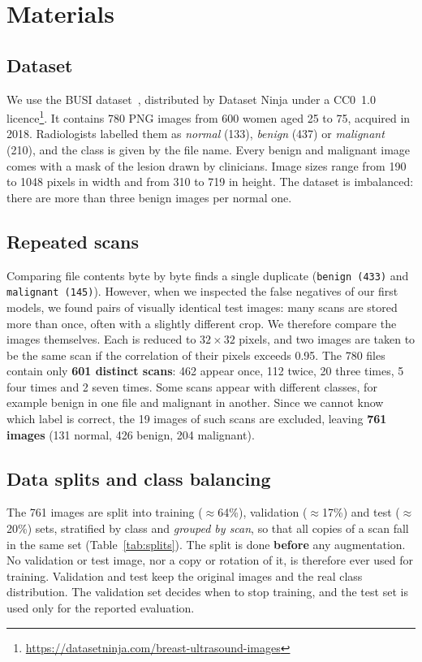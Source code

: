 \documentclass{article}
\begin{document}
\section{Materials}
\label{sec:materials}

\subsection{Dataset}
We use the BUSI dataset~\cite{aldhabyani2020busi}, distributed by Dataset Ninja under a
CC0~1.0 licence\footnote{\url{https://datasetninja.com/breast-ultrasound-images}}. It contains 780 PNG images from 600 women aged 25 to
75, acquired in 2018. Radiologists labelled them as \emph{normal} (133), \emph{benign} (437)
or \emph{malignant} (210), and the class is given by the file name. Every benign and
malignant image comes with a mask of the lesion drawn by clinicians. Image sizes range from
190 to 1048 pixels in width and from 310 to 719 in height. The dataset is imbalanced: there
are more than three benign images per normal one.

\subsection{Repeated scans}
Comparing file contents byte by byte finds a single duplicate (\texttt{benign (433)} and
\texttt{malignant (145)}). However, when we inspected the false negatives of our first
models, we found pairs of visually identical test images: many scans are stored more than
once, often with a slightly different crop. We therefore compare the images themselves.
Each is reduced to $32\times32$ pixels, and two images are taken to be the same scan if the
correlation of their pixels exceeds 0.95. The 780 files contain only \textbf{601 distinct
scans}: 462 appear once, 112 twice, 20 three times, 5 four times and 2 seven times. Some
scans appear with different classes, for example benign in one file and malignant in
another. Since we cannot know which label is correct, the 19 images of such scans are
excluded, leaving \textbf{761 images} (131 normal, 426 benign, 204 malignant).

\subsection{Data splits and class balancing}
The 761 images are split into training ($\approx$64\%), validation ($\approx$17\%) and
test ($\approx$20\%) sets, stratified by class and \emph{grouped by scan}, so that all
copies of a scan fall in the same set (Table~\ref{tab:splits}). The split is done
\textbf{before} any augmentation. No validation or test image, nor a copy or rotation of it,
is therefore ever used for training. Validation and test keep the original images and the
real class distribution. The validation set decides when to stop training, and the test
set is used only for the reported evaluation.
\end{document}
